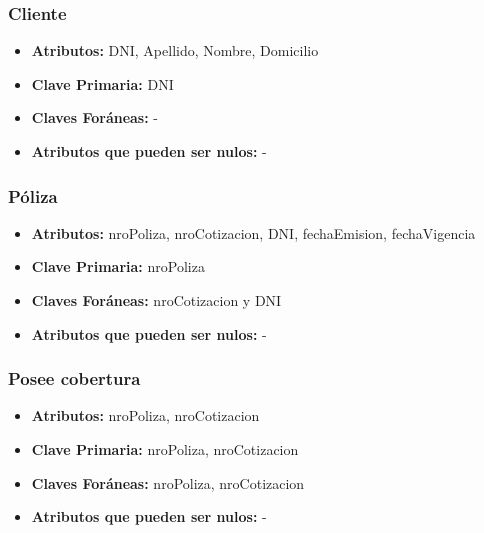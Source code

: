 \documentclass[a4paper,11pt]{article}
\begin{document}
\subsubsection{Cliente}

\begin{itemize}

	\item \textbf{Atributos:} DNI, Apellido, Nombre, Domicilio

	\item \textbf{Clave Primaria:} DNI

	\item \textbf{Claves Foráneas:} -

	\item \textbf{Atributos que pueden ser nulos:} -
	
\end{itemize}

\subsubsection{Póliza}

\begin{itemize}

	\item \textbf{Atributos:} nroPoliza, nroCotizacion, DNI, fechaEmision, fechaVigencia

	\item \textbf{Clave Primaria:} nroPoliza

	\item \textbf{Claves Foráneas:} nroCotizacion y DNI

	\item \textbf{Atributos que pueden ser nulos:} -
	
\end{itemize}

\subsubsection{Posee cobertura}

\begin{itemize}

	\item \textbf{Atributos:} nroPoliza, nroCotizacion

	\item \textbf{Clave Primaria:} nroPoliza, nroCotizacion
	
	\item \textbf{Claves Foráneas:} nroPoliza, nroCotizacion

	\item \textbf{Atributos que pueden ser nulos:} -
	
\end{itemize}
\end{document}
